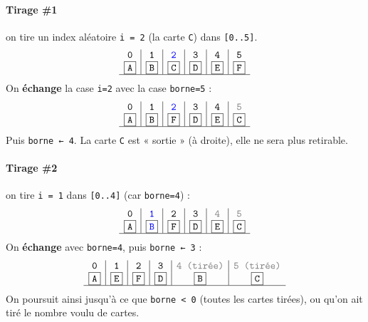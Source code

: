 \paragraph{Tirage \#1} on tire un index aléatoire \texttt{i = 2} (la carte \texttt{C}) dans \texttt{[0..5]}.
\[
\begin{array}{c|c|c|c|c|c}
\texttt{0} & \texttt{1} & \color{blue}{\texttt{2}} & \texttt{3} & \texttt{4} & \texttt{5}\\
\boxed{\texttt{A}} & \boxed{\texttt{B}} & \boxed{\texttt{C}} & \boxed{\texttt{D}} & \boxed{\texttt{E}} & \boxed{\texttt{F}} \\
\hline
\end{array}
\]
On \textbf{échange} la case \texttt{i=2} avec la case \texttt{borne=5} :
\[
\begin{array}{c|c|c|c|c|c}
\texttt{0} & \texttt{1} & \color{blue}{\texttt{2}} & \texttt{3} & \texttt{4} & \color{gray}{\texttt{5}}\\
\boxed{\texttt{A}} & \boxed{\texttt{B}} & \boxed{\texttt{F}} & \boxed{\texttt{D}} & \boxed{\texttt{E}} & \fbox{\texttt{C}} \\
\hline
\end{array}
\]
Puis \texttt{borne ← 4}. La carte \texttt{C} est « sortie » (à droite), elle ne sera plus retirable.

\paragraph{Tirage \#2} on tire \texttt{i = 1} dans \texttt{[0..4]} (car \texttt{borne=4}) :
\[
\begin{array}{c|c|c|c|c|c}
\texttt{0} & \color{blue}{\texttt{1}} & \texttt{2} & \texttt{3} & \color{gray}{\texttt{4}} & \color{gray}{\texttt{5}}\\
\boxed{\texttt{A}} & \boxed{\color{blue}{\texttt{B}}} & \boxed{\texttt{F}} & \boxed{\texttt{D}} & \boxed{\texttt{E}} & \fbox{\texttt{C}} \\
\hline
\end{array}
\]
On \textbf{échange} avec \texttt{borne=4}, puis \texttt{borne ← 3} :
\[
\begin{array}{c|c|c|c|c|c}
\texttt{0} & \texttt{1} & \texttt{2} & \texttt{3} & \color{gray}{\texttt{4 (tirée)}} & \color{gray}{\texttt{5 (tirée)}}\\
\boxed{\texttt{A}} & \boxed{\texttt{E}} & \boxed{\texttt{F}} & \boxed{\texttt{D}} & \fbox{\texttt{B}} & \fbox{\texttt{C}} \\
\hline
\end{array}
\]
On poursuit ainsi jusqu’à ce que \texttt{borne < 0} (toutes les cartes tirées), ou qu’on ait tiré le nombre voulu de cartes.

